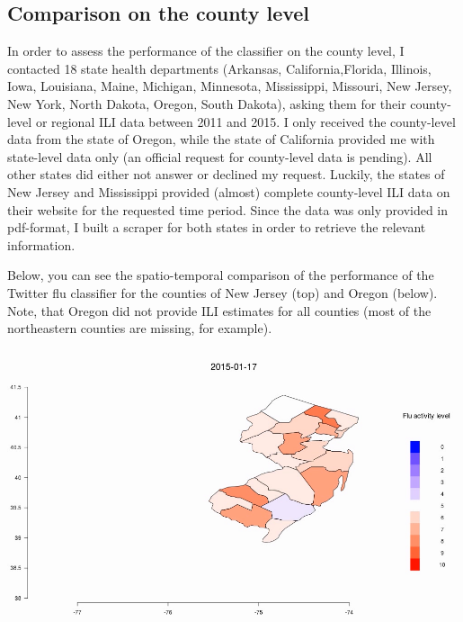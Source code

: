 \documentclass[11pt, a4paper]{article}\usepackage[]{graphicx}\usepackage[]{color}
\begin{document}
\raggedright

\subsection{Comparison on the county level}
In order to assess the performance of the classifier on the county level, I contacted 18 state health departments (Arkansas, California,Florida, Illinois, Iowa, Louisiana, Maine, Michigan, Minnesota, Mississippi, Missouri, New Jersey, New York, North Dakota, Oregon, South Dakota), asking them for their county-level or regional ILI data between 2011 and 2015. I only received the county-level data from the state of Oregon, while the state of California provided me with state-level data only (an official request for county-level data is pending). All other states did either not answer or declined my request. Luckily, the states of New Jersey and Mississippi provided (almost) complete county-level ILI data on their website for the requested time period. Since the data was only provided in pdf-format, I built a scraper for both states in order to retrieve the relevant information.\newline 

Below, you can see the spatio-temporal comparison of the performance of the Twitter flu classifier for the counties of New Jersey (top) and Oregon (below). Note, that Oregon did not provide ILI estimates for all counties (most of the northeastern counties are missing, for example).\newline

\centering \href{run:vids/county_Twitter_cdc_diff_newjersey.avi}{\includegraphics[scale=0.5]{vids/Screenshot_Jersey.png}} 

\bigskip
\end{document}
